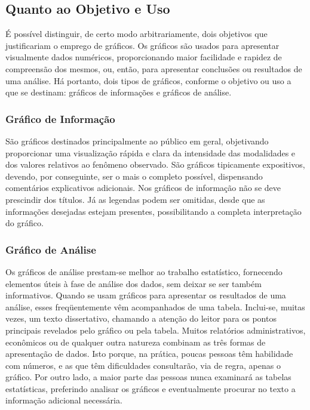 \subsection{Quanto ao Objetivo e Uso}

É possível distinguir, de certo modo arbitrariamente, dois objetivos que justificariam o emprego de gráficos. Os gráficos são usados para apresentar visualmente dados numéricos, proporcionando maior facilidade e rapidez de compreensão dos mesmos, ou, então, para apresentar conclusões ou resultados de uma análise. Há portanto, dois tipos de gráficos, conforme o objetivo ou uso a que se destinam: gráficos de informações e gráficos de análise.


\subsubsection{Gráfico de Informação}

\inic São gráficos destinados principalmente ao público em geral, objetivando proporcionar uma visualização rápida e clara da intensidade das modalidades e dos valores relativos ao fenômeno observado. São gráficos tipicamente expositivos, devendo, por conseguinte, ser o mais o completo possível, dispensando comentários explicativos adicionais. Nos gráficos de informação não se deve prescindir dos títulos. Já as legendas podem ser omitidas, desde que as informações desejadas  estejam presentes, possibilitando a completa interpretação do gráfico.

\subsubsection{Gráfico de Análise}

\inic Os gráficos de análise prestam-se melhor ao trabalho estatístico, fornecendo elementos úteis à fase de análise dos dados, sem deixar se ser também informativos. Quando se usam gráficos para apresentar os resultados de uma análise, esses freqüentemente vêm acompanhados de uma tabela. Inclui-se, muitas vezes, um texto dissertativo, chamando a atenção do leitor para os pontos principais revelados pelo gráfico ou pela tabela. Muitos relatórios administrativos, econômicos ou de qualquer outra natureza combinam as três formas de apresentação de dados. Isto porque, na prática, poucas pessoas têm habilidade com números, e as que têm dificuldades consultarão, via de regra, apenas o gráfico. Por outro lado, a maior parte das pessoas nunca examinará as tabelas estatísticas, preferindo analisar os gráficos e eventualmente procurar no texto a informação adicional necessária.\vskip0.3cm



















